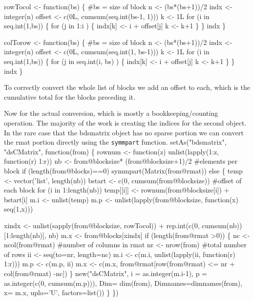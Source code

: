 \documentclass{article}
\begin{document}
\nwenddocs{}\endmoddef
rowTocol <- function(bs) \{  #bs = size of block
    n <- (bs*(bs+1))/2
    indx <- integer(n)
    offset <- c(0L, cumsum(seq.int(bs-1, 1)))
    k <- 1L
    for (i in seq.int(1,bs)) \{
        for (j in 1:i ) \{
            indx[k] <- i + offset[j]
            k <- k+1
            \}
        \}
    indx                              
\}

colTorow <- function(bs) \{  #bs = size of block
    n <- (bs*(bs+1))/2
    indx <- integer(n)
    offset <- c(0L, cumsum(seq.int(1, bs-1)))
    k <- 1L
    for (i in seq.int(1,bs)) \{
        for (j in seq.int(i, bs) ) \{
            indx[k] <- i + offset[j]
            k <- k+1
            \}
        \}
    indx                              
\}
\nwendcode{}\nwdocspar

To correctly convert the whole list of blocks we
add an offset to each, which is the cumulative total
for the blocks preceding it.


Now for the actual conversion, which is mostly a
bookkeeping/counting operation. 
The majority of the work is creating
the indices for the second object.  In the rare case
that the bdsmatrix object has no sparse portion we 
can convert the rmat portion directly using the {\tt{}symmpart}
function.
\nwenddocs{}\plusendmoddef
setAs("bdsmatrix", "dsCMatrix", function(from) \{
    rownum <- function(z) unlist(lapply(1:z, function(r) 1:r))
    nb <- from@blocksize* (from@blocksize+1)/2  #elements per block
    if (length(from@blocks)==0) symmpart(Matrix(from@rmat))
    else \{
        temp <- vector('list', length(nb))
        bstart <- c(0, cumsum(from@blocksize)) #offset of each block
        for (i in 1:length(nb)) 
            temp[[i]] <- rownum(from@blocksize[i]) + bstart[i]
        m.i <- unlist(temp)
        m.p <- unlist(lapply(from@blocksize, function(x) seq(1,x)))

        xindx <- unlist(sapply(from@blocksize, rowTocol)) +
                 rep.int(c(0, cumsum(nb))[1:length(nb)], nb)      
        m.x <- from@blocks[xindx]
        if (length(from@rmat >0)) \{
            nc <- ncol(from@rmat)  #number of columns in rmat
            nr <- nrow(from)     #total number of rows
            ii <- seq(to=nr, length=nc)
            m.i <- c(m.i, unlist(lapply(ii, function(r) 1:r)))
            m.p <- c(m.p, ii)
            m.x <- c(m.x, from@rmat[row(from@rmat) <= nr + col(from@rmat) -nc])
            \}          
        new("dsCMatrix", 
                 i = as.integer(m.i-1),
                 p = as.integer(c(0, cumsum(m.p))),
                 Dim= dim(from),
                 Dimnames=dimnames(from),
                 x= m.x,
                 uplo='U',
                 factors=list())
    \}
\})             
\nwendcode{}\nwdocspar
\end{document}
